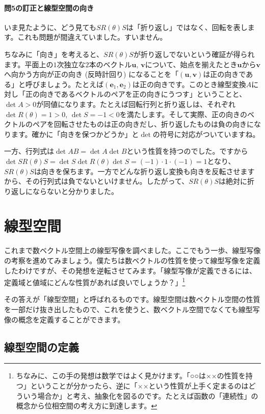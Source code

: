 \paragraph{問5の訂正と線型空間の向き} いま見たように、どう見ても$SR(\theta)S$は「折り返し」ではなく、回転を表します。これも問題が間違えていました。すいません。

ちなみに「向き」を考えると、$SR(\theta)S$が折り返しでないという確証が得られます。平面上の$1$次独立な$2$本のベクトル$\bm{u}$, $\bm{v}$について、始点を揃えたとき$\bm{u}$から$\bm{v}$へ向かう方向が正の向き (反時計回り) になることを「$(\bm{u}, \bm{v})$は正の向きである」と呼びましょう。たとえば$(\bm{e}_1, \bm{e}_2)$は正の向きです。このとき線型変換$A$に対し「正の向きであるベクトルのペアを正の向きにうつす」ということと、$\det A>0$が同値になります。たとえば回転行列と折り返しは、それぞれ$\det R(\theta) = 1 > 0$, $\det S = -1 <0$を満たします。そして実際、正の向きのベクトルのペアを回転させたものは正の向きだし、折り返したものは負の向きになります。確かに「向きを保つかどうか」と$\det$の符号に対応がついていますね。

一方、行列式は$\det AB = \det A \det B$という性質を持つのでした。ですから$\det S R(\theta) S = \det S \det R(\theta) \det S = (-1)\cdot 1\cdot (-1) = 1$となり、$S R(\theta) S$は向きを保ちます。一方でどんな折り返し変換も向きを反転させますから、その行列式は負でないといけません。したがって、$S R(\theta) S$は絶対に折り返しにならないと分かりました。

\section{線型空間}

これまで数ベクトル空間上の線型写像を調べました。ここでもう一歩、線型写像の考察を進めてみましょう。僕たちは数ベクトルの性質を使って線型写像を定義したわけですが、その発想を逆転させてみます。「線型写像が定義できるには、定義域と値域にどんな性質があれば良いでしょうか？」\footnote{ちなみに、この手の発想は数学ではよく見かけます。「○○は××の性質を持つ」ということが分かったら、逆に「××という性質が上手く定まるのはどういう場合か」と考え、抽象化を図るのです。たとえば函数の「連続性」の概念から位相空間の考え方に到達します。}

その答えが「線型空間」と呼ばれるものです。線型空間は数ベクトル空間の性質を一部だけ抜き出したもので、これを使うと、数ベクトル空間でなくても線型写像の概念を定義することができます。

\subsection{線型空間の定義}

